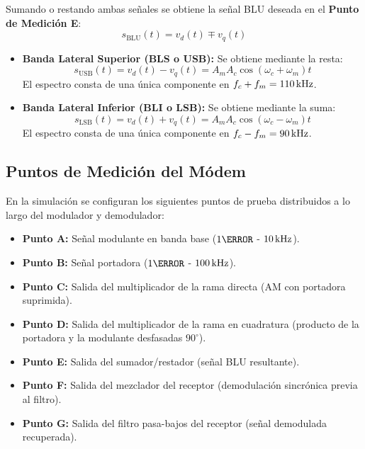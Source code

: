 Sumando o restando ambas señales se obtiene la señal BLU deseada en el \textbf{Punto de Medición E}:
\begin{equation}
    s_{\text{BLU}}(t) = v_d(t) \mp v_q(t)
\end{equation}

\begin{itemize}
    \item \textbf{Banda Lateral Superior (BLS o USB):} Se obtiene mediante la resta:
          \begin{equation}
              s_{\text{USB}}(t) = v_d(t) - v_q(t) = A_m A_c \cos(\omega_c + \omega_m)t
          \end{equation}
          El espectro consta de una única componente en $f_c + f_m = 110\,\mathrm{kHz}$.
    \item \textbf{Banda Lateral Inferior (BLI o LSB):} Se obtiene mediante la suma:
          \begin{equation}
              s_{\text{LSB}}(t) = v_d(t) + v_q(t) = A_m A_c \cos(\omega_c - \omega_m)t
          \end{equation}
          El espectro consta de una única componente en $f_c - f_m = 90\,\mathrm{kHz}$.
\end{itemize}

\subsection{Puntos de Medición del Módem}
En la simulación se configuran los siguientes puntos de prueba distribuidos a lo largo del modulador y demodulador:
\begin{itemize}
    \item \textbf{Punto A:} Señal modulante en banda base ($1\V$ - $10\,\mathrm{kHz}$).
    \item \textbf{Punto B:} Señal portadora ($1\V$ - $100\,\mathrm{kHz}$).
    \item \textbf{Punto C:} Salida del multiplicador de la rama directa (AM con portadora suprimida).
    \item \textbf{Punto D:} Salida del multiplicador de la rama en cuadratura (producto de la portadora y la modulante desfasadas $90^\circ$).
    \item \textbf{Punto E:} Salida del sumador/restador (señal BLU resultante).
    \item \textbf{Punto F:} Salida del mezclador del receptor (demodulación sincrónica previa al filtro).
    \item \textbf{Punto G:} Salida del filtro pasa-bajos del receptor (señal demodulada recuperada).
\end{itemize}

